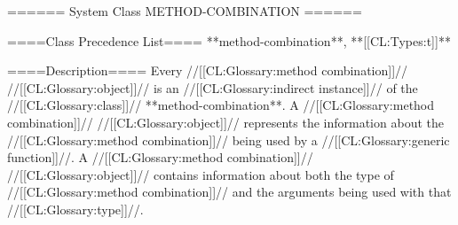 ====== System Class METHOD-COMBINATION ======

====Class Precedence List==== 
**method-combination**, **[[CL:Types:t]]**

====Description====
Every //[[CL:Glossary:method combination]]// //[[CL:Glossary:object]]// is an //[[CL:Glossary:indirect instance]]// of the //[[CL:Glossary:class]]// **method-combination**. A //[[CL:Glossary:method combination]]// //[[CL:Glossary:object]]// represents the information about the //[[CL:Glossary:method combination]]// being used by a //[[CL:Glossary:generic function]]//. A //[[CL:Glossary:method combination]]// //[[CL:Glossary:object]]// contains information about both the type of //[[CL:Glossary:method combination]]// and the arguments being used with that //[[CL:Glossary:type]]//.

